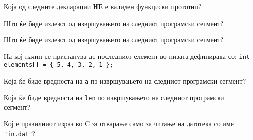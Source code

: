 \documentclass[11pt]{examdesign}
\begin{document}


\begin{multiplechoice}[title={},suppressprefix=yes,rearrange=no]
\begin{question}
Која од следните декларации \textbf{НЕ} е валиден функциски прототип?
\end{question}

\begin{question}

Што ќе биде излезот од извршувањето на следниот програмски сегмент?
\end{question}

\begin{question}
Што ќе биде излезот од извршувањето на следниот програмски сегмент?
\end{question}

\begin{question}
На кој начин се пристапува до последниот елемент во низата дефинирана со: 
\texttt{int elements[] = \{ 5, 4, 3, 2, 1 \};}
\end{question}

\begin{question}
Која ќе биде вредноста на \texttt{a} по извршувањето на следниот програмски сегмент?
\end{question}
  
\begin{question}
Која ќе биде вредноста на \texttt{len} по извршувањето на следниот програмски сегмент?
\end{question}
  
\begin{question}
Кој е правилниот израз во C за отварање само за читање на датотека со име \texttt{"in.dat"}?
\end{question}


\end{multiplechoice}
\end{document}

